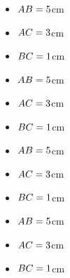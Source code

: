 \begin{minipage}{0.22\textwidth}
    \begin{itemize}
        \item $AB=5$cm
        \item $AC=3$cm
        \item $BC=1$cm
    \end{itemize}
    \begin{center}
        \filling
    \end{center}
\end{minipage}
\hfil
\vrule
\hfil
\begin{minipage}{0.22\textwidth}
    \begin{itemize}
        \item $AB=5$cm
        \item $AC=3$cm
        \item $BC=1$cm
    \end{itemize}
    \begin{center}
        \filling
    \end{center}
\end{minipage}
\hfil
\vrule
\hfil
\begin{minipage}{0.22\textwidth}
    \begin{itemize}
        \item $AB=5$cm
        \item $AC=3$cm
        \item $BC=1$cm
    \end{itemize}
    \begin{center}
        \filling
    \end{center}
\end{minipage}
\hfil
\vrule
\hfil
\begin{minipage}{0.22\textwidth}
    \begin{itemize}
        \item $AB=5$cm
        \item $AC=3$cm
        \item $BC=1$cm
    \end{itemize}
    \begin{center}
        \filling
    \end{center}
\end{minipage}
\vfil

